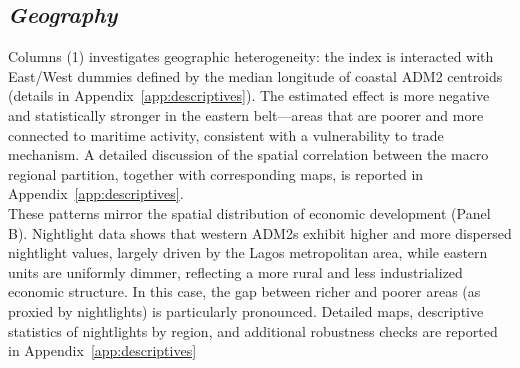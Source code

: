 \subsection{\textit{Geography}} 
Columns (1) investigates geographic heterogeneity: the index is interacted with East/West dummies defined by the median longitude of coastal ADM2 centroids (details in Appendix~\ref{app:descriptives}). The estimated effect is more negative and statistically stronger in the eastern belt—areas that are poorer and more connected to maritime activity, consistent with a vulnerability to trade mechanism.
A detailed discussion of the spatial correlation between the macro regional partition, together with corresponding maps, is reported in Appendix~\ref{app:descriptives}.\\

These patterns mirror the spatial distribution of economic development (Panel B). Nightlight data shows that 
western ADM2s exhibit higher and more dispersed nightlight values, largely driven by the Lagos metropolitan area, while eastern units are uniformly dimmer, reflecting a more rural and less industrialized economic structure. In this case, the gap between richer and poorer areas (as proxied by nightlights) is particularly pronounced.
Detailed maps, descriptive statistics of nightlights by region, and additional robustness checks are reported in Appendix~\ref{app:descriptives}\\

